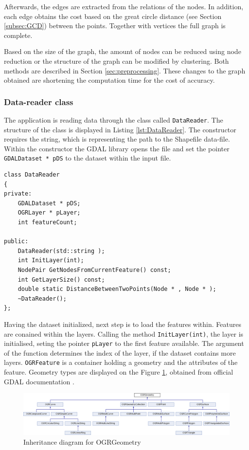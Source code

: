 \documentclass[thesis=M,english]{FITthesis}[2012/10/20]
\begin{document}
Afterwards, the edges are extracted from the relations of the nodes. In addition, each edge obtains the cost based on the great circle distance (see Section \ref{subsec:GCD}) between the points. Together with vertices the full graph is complete.

Based on the size of the graph, the amount of nodes can be reduced using node reduction or the structure of the graph can be modified by clustering. Both methods are described in Section \ref{sec:preprocessing}. These changes to the graph obtained are shortening the computation time for the cost of accuracy.

\subsubsection{Data-reader class}
The application is reading data through the class called \texttt{DataReader}. The structure of the class is displayed in Listing \ref{lst:DataReader}. The constructor requires the string, which is representing the path to the Shapefile data-file. Within the constructor the GDAL library opens the file and set the pointer \texttt{GDALDataset * pDS} to the dataset within the input file.

\begin{lstlisting}[frame=single, caption={\texttt{DataReader} class}, label={lst:DataReader}]
class DataReader
{
private:
    GDALDataset * pDS;
    OGRLayer * pLayer;
    int featureCount;

public:
    DataReader(std::string );
    int InitLayer(int);
    NodePair GetNodesFromCurrentFeature() const;
    int GetLayerSize() const;
    double static DistanceBetweenTwoPoints(Node * , Node * );
    ~DataReader();
};
\end{lstlisting}

Having the dataset initialized, next step is to load the features within. Features are conained within the layers. Calling the method \texttt{InitLayer(int)}, the layer is initialised, seting the pointer \texttt{pLayer} to the first feature available. The argument of the function determines the index of the layer, if the dataset contains more layers. \texttt{OGRFeature} is a container holding a geometry and the attributes of the feature. Geometry types are displayed on the Figure \ref{pic:OGRGeo}, obtained from official GDAL documentation \cite{GDAL17}. 


\begin{figure}[H]
\centering
\includegraphics[width=1\textwidth]{pics/classOGRGeometry}
\caption{Inheritance diagram for OGRGeometry}
\label{pic:OGRGeo}
\end{figure}
\end{document}
